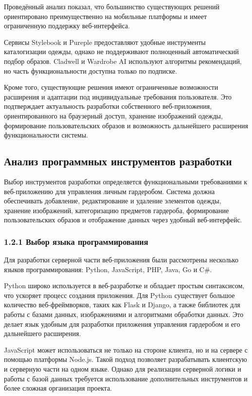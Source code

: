 Проведённый анализ показал, что большинство существующих решений ориентировано преимущественно на мобильные платформы и имеет ограниченную поддержку веб-интерфейса. 

Сервисы Stylebook и Pureple предоставляют удобные инструменты каталогизации одежды, однако не поддерживают полноценный автоматический подбор образов. Cladwell и Wardrobe AI используют алгоритмы рекомендаций, но часть функциональности доступна только по подписке. 

Кроме того, существующие решения имеют ограниченные возможности расширения и адаптации под индивидуальные требования пользователя. Это подтверждает актуальность разработки собственного веб-приложения, ориентированного на браузерный доступ, хранение изображений одежды, формирование пользовательских образов и возможность дальнейшего расширения функциональности системы.

\subsection{Анализ программных инструментов разработки}

Выбор инструментов разработки определяется функциональными требованиями к веб-приложению для управления личным гардеробом. Система должна обеспечивать добавление, редактирование и удаление элементов одежды, хранение изображений, категоризацию предметов гардероба, формирование пользовательских образов и отображение данных через удобный веб-интерфейс.

\subsubsection*{\hspace{1.25cm}1.2.1 Выбор языка программирования}

Для разработки серверной части веб-приложения были рассмотрены несколько языков программирования: Python, JavaScript, PHP, Java, Go и C\#.

Python широко используется в веб-разработке и обладает простым синтаксисом, что ускоряет процесс создания приложения. Для Python существует большое количество веб-фреймворков, таких как Flask и Django, а также библиотек для работы с базами данных, изображениями и алгоритмами обработки данных. Это делает язык удобным для разработки приложения управления гардеробом и его дальнейшего расширения.

JavaScript может использоваться не только на стороне клиента, но и на сервере с помощью платформы Node.js. Такой подход позволяет разрабатывать клиентскую и серверную части на одном языке. Однако для реализации серверной логики и работы с базой данных требуется использование дополнительных инструментов и более сложная организация проекта.

